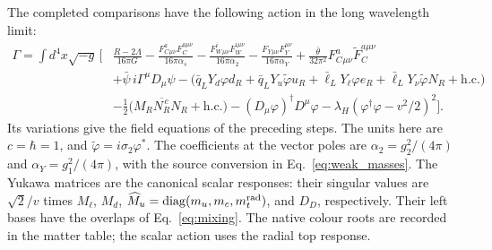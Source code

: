 \documentclass[aps,prx,reprint,longbibliography]{revtex4-2}
\providecommand{\diag}{\operatorname{diag}}
\begin{document}
The completed comparisons have the following action in the long wavelength limit:
\begin{equation}
\begin{split}
\Gamma=\int d^4x\sqrt{-g}\,\bigg[&
 \frac{R-2\Lambda}{16\pi G}
 -\frac{F_C^a{}_{\mu\nu}F_C^{a\mu\nu}}{16\pi\alpha_s}
 -\frac{F_W^i{}_{\mu\nu}F_W^{i\mu\nu}}{16\pi\alpha_2}
 -\frac{F_Y{}_{\mu\nu}F_Y^{\mu\nu}}{16\pi\alpha_Y}
 +\frac{\bar\theta}{32\pi^2}F_C^a{}_{\mu\nu}\widetilde F_C^{a\mu\nu}\\
 &+\bar\psi\,i\Gamma^\mu D_\mu\psi
 -\bigl(\bar q_LY_d\varphi d_R+\bar q_LY_u\widetilde\varphi u_R
       +\bar\ell_LY_\ell\varphi e_R+\bar\ell_LY_\nu\widetilde\varphi N_R
       +\mathrm{h.c.}\bigr)\\
 &-\frac12\bigl(M_R\overline{N_R^{\,c}}N_R+\mathrm{h.c.}\bigr)
 -(D_\mu\varphi)^\dagger D^\mu\varphi
 -\lambda_H(\varphi^\dagger\varphi-v^2/2)^2\bigg].
\end{split}
\label{eq:complete_action}
\end{equation}
Its variations give the field equations of the preceding steps. The units here are $c=\hbar=1$, and $\widetilde\varphi=i\sigma_2\varphi^*$. The coefficients at the vector poles are $\alpha_2=g_2^2/(4\pi)$ and $\alpha_Y=g_1^2/(4\pi)$, with the source conversion in Eq.~\eqref{eq:weak_masses}. The Yukawa matrices are the canonical scalar responses: their singular values are $\sqrt2/v$ times $M_\ell$, $M_d$, $\widehat M_u=\diag(m_u,m_c,m_t^{\rm rad})$, and $D_D$, respectively. Their left bases have the overlaps of Eq.~\eqref{eq:mixing}. The native colour roots are recorded in the matter table; the scalar action uses the radial top response.
\end{document}
